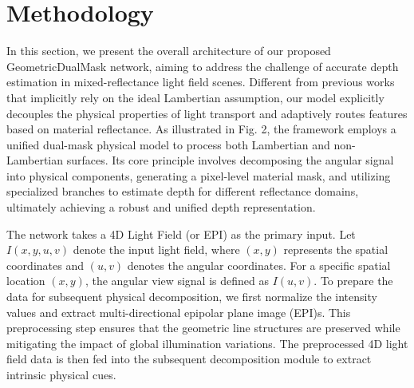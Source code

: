 \section{Methodology}

In this section, we present the overall architecture of our proposed GeometricDualMask network, aiming to address the challenge of accurate depth estimation in mixed-reflectance light field scenes. Different from previous works that implicitly rely on the ideal Lambertian assumption, our model explicitly decouples the physical properties of light transport and adaptively routes features based on material reflectance. As illustrated in Fig. 2, the framework employs a unified dual-mask physical model to process both Lambertian and non-Lambertian surfaces. Its core principle involves decomposing the angular signal into physical components, generating a pixel-level material mask, and utilizing specialized branches to estimate depth for different reflectance domains, ultimately achieving a robust and unified depth representation.

The network takes a 4D Light Field (or EPI) as the primary input. Let $I(x,y,u,v)$ denote the input light field, where $(x,y)$ represents the spatial coordinates and $(u,v)$ denotes the angular coordinates. For a specific spatial location $(x,y)$, the angular view signal is defined as $I(u,v)$. To prepare the data for subsequent physical decomposition, we first normalize the intensity values and extract multi-directional epipolar plane image (EPI)s. This preprocessing step ensures that the geometric line structures are preserved while mitigating the impact of global illumination variations. The preprocessed 4D light field data is then fed into the subsequent decomposition module to extract intrinsic physical cues.

